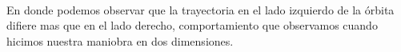 \documentclass{article}
\begin{document}
    \begin{center}
    \end{center}
    { \hspace*{\fill} \\}
    
    En donde podemos observar que la trayectoria en el lado izquierdo de la
órbita difiere mas que en el lado derecho, comportamiento que observamos
cuando hicimos nuestra maniobra en dos dimensiones.


    
    {}
    
    
    
\end{document}
